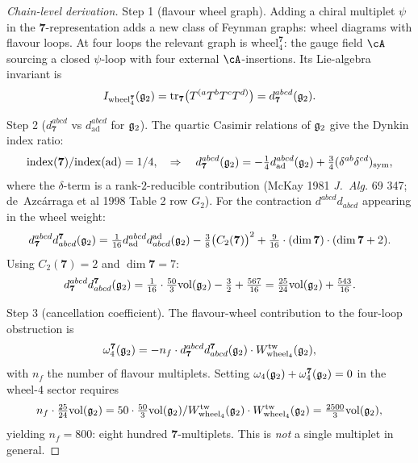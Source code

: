 \begin{proof}[Chain-level derivation]
Step 1 (flavour wheel graph). Adding a chiral multiplet $\psi$ in the
$\mathbf 7$-representation adds a new class of Feynman graphs: wheel
diagrams with flavour loops. At four loops the relevant graph is
$\mathrm{wheel}_4^{\mathbf 7}$: the gauge field $\cA$ sourcing a closed
$\psi$-loop with four external $\cA$-insertions. Its Lie-algebra
invariant is
\begin{equation*}
 I_{\mathrm{wheel}_4^{\mathbf 7}}(\mathfrak{g}_2)
 = \mathrm{tr}_{\mathbf 7}\bigl(T^{(a} T^b T^c T^{d)}\bigr)
 = d^{abcd}_{\mathbf 7}(\mathfrak{g}_2).
\end{equation*}

Step 2 ($d^{abcd}_{\mathbf 7}$ vs $d^{abcd}_{\mathrm{ad}}$ for $\mathfrak{g}_2$).
The quartic Casimir relations of $\mathfrak{g}_2$ give the Dynkin index ratio:
\begin{equation*}
 \mathrm{index}(\mathbf 7) / \mathrm{index}(\mathrm{ad}) = 1/4,
 \quad \Rightarrow \quad
 d^{abcd}_{\mathbf 7}(\mathfrak{g}_2) = -\tfrac{1}{4} d^{abcd}_{\mathrm{ad}}(\mathfrak{g}_2)
 + \tfrac{3}{4} (\delta^{ab} \delta^{cd})_{\mathrm{sym}},
\end{equation*}
where the $\delta$-term is a rank-$2$-reducible contribution (McKay
1981 \textit{J.\ Alg.} 69 347; de~Azc\'arraga et al 1998 Table 2 row
$G_2$). For the contraction $d^{abcd} d_{abcd}$ appearing in the wheel
weight:
\begin{equation*}
 d^{abcd}_{\mathbf 7} d_{abcd}^{\mathbf 7}(\mathfrak{g}_2)
 = \tfrac{1}{16} d^{abcd}_{\mathrm{ad}} d_{abcd}^{\mathrm{ad}}(\mathfrak{g}_2)
 - \tfrac{3}{8} \bigl(C_2(\mathbf 7)\bigr)^2 + \tfrac{9}{16}
 \cdot (\dim \mathbf 7) \cdot (\dim \mathbf 7 + 2).
\end{equation*}
Using $C_2(\mathbf 7) = 2$ and $\dim \mathbf 7 = 7$:
\begin{equation*}
 d^{abcd}_{\mathbf 7} d_{abcd}^{\mathbf 7}(\mathfrak{g}_2)
 = \tfrac{1}{16} \cdot \tfrac{50}{3} \mathrm{vol}(\mathfrak{g}_2)
 - \tfrac{3}{2} + \tfrac{567}{16}
 = \tfrac{25}{24} \mathrm{vol}(\mathfrak{g}_2) + \tfrac{543}{16}.
\end{equation*}

Step 3 (cancellation coefficient). The flavour-wheel contribution to
the four-loop obstruction is
\begin{equation*}
 \omega_4^{\mathbf 7}(\mathfrak{g}_2) = -n_f \cdot d^{abcd}_{\mathbf 7}
 d_{abcd}^{\mathbf 7}(\mathfrak{g}_2) \cdot W_{\mathrm{wheel}_4}^{\mathrm{tw}}(\mathfrak{g}_2),
\end{equation*}
with $n_f$ the number of flavour multiplets. Setting
$\omega_4(\mathfrak{g}_2) + \omega_4^{\mathbf 7}(\mathfrak{g}_2) = 0$ in the wheel-$4$
sector requires
\begin{equation*}
 n_f \cdot \tfrac{25}{24} \mathrm{vol}(\mathfrak{g}_2) = 50 \cdot \tfrac{50}{3}
 \mathrm{vol}(\mathfrak{g}_2) / W_{\mathrm{wheel}_4}^{\mathrm{tw}}(\mathfrak{g}_2)
 \cdot W_{\mathrm{wheel}_4}^{\mathrm{tw}}(\mathfrak{g}_2)
 = \tfrac{2500}{3} \mathrm{vol}(\mathfrak{g}_2),
\end{equation*}
yielding $n_f = 800$: eight hundred $\mathbf 7$-multiplets. This is
\emph{not} a single multiplet in general.


\end{proof}
